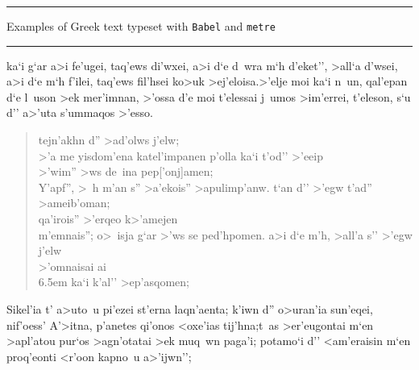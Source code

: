 \documentclass[11pt]{report}
\begin{document}
\vspace{5ex}
\hrule height 1.5pt \vspace{2ex}
{\large Examples of Greek text typeset with \texttt{Babel} and %
  \texttt{metre}}
\vspace{2ex}
\hrule height 1.5pt
\vspace{7ex}
{\obeylines\everypar{\quad}
ka`i g`ar a>i fe'ugei, taq'ews di'wxei,
a>i d`e d~wra m`h d'eket'', >all`a d'wsei,
a>i d`e m`h f'ilei, taq'ews fil'hsei
ko>uk >ej'eloisa.\linea* 
>'elje moi ka`i n~un, qal'epan d`e l~uson
>ek mer'imnan, >'ossa d'e moi t'elessai
j~umos >im'errei, t'eleson, s`u d'' a>'uta
s'ummaqos >'esso.\geminata*
}
\vspace{5ex}
\begin{verse}
tejn'akhn d'' >ad'olws j'elw;\\
>'a me yisdom'ena katel'impanen\linea
p'olla ka`i t'od'' >'eeip\punctum\lbrack\\
>'wim'' >ws de~ina pep['onj]amen;\\
Y'apf'', >~h m'an s'' >a'ekois'' >apulimp'anw.\linea
t`an d'' >'egw t'ad'' >ameib'oman;\\
qa'irois'' >'erqeo k>'amejen\\
m'emnais''; o>~isja g`ar >'ws se ped'hpomen.\linea
a>i d`e m'h, >all'a s'' >'egw j'elw\\
>'omnaisai\lbrack\punctum[3]\Punctum\rbrack%
 \lbrack\punctum[2]\Punctum\rbrack\punctum[2]ai\\
 \punctum[2]\lbrack\kern 6.5em\rbrack%
   ka`i k'al'' >ep'asqomen;\linea
\end{verse}
\vspace{5ex}
{\obeylines\everypar{\quad}
Sikel'ia t' a>uto~u pi'ezei
st'erna laq\positio n'aenta; k'iwn d'' o>uran'ia sun'eqei,
nif'oess' A'>itna, p'anetes
qi'onos <oxe'ias tij'hna;\lunata*[.1]
t~as >er'eugontai m`en >ap\positio l'atou pur`os >ag\positio n'otatai
>ek muq~wn paga'i; potamo`i
\quad d'' <am'eraisin m`en proq'eonti <r'oon kap\Positio no~u
a>'ijwn'';
}
\newpage
\end{document}
